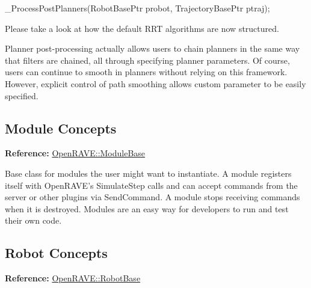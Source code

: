 \begin{DoxyCode}
_ProcessPostPlanners(RobotBasePtr probot, TrajectoryBasePtr ptraj);
\end{DoxyCode}


Please take a look at how the default RRT algorithms are now structured.

Planner post-\/processing actually allows users to chain planners in the same way that filters are chained, all through specifying planner parameters. Of course, users can continue to smooth in planners without relying on this framework. However, explicit control of path smoothing allows custom parameter to be easily specified. \hypertarget{arch_module}{}\subsection{Module Concepts}\label{arch_module}
{\bfseries Reference:} \hyperlink{classOpenRAVE_1_1ModuleBase}{OpenRAVE::ModuleBase}

Base class for modules the user might want to instantiate. A module registers itself with OpenRAVE's SimulateStep calls and can accept commands from the server or other plugins via SendCommand. A module stops receiving commands when it is destroyed. Modules are an easy way for developers to run and test their own code. \hypertarget{arch_robot}{}\subsection{Robot Concepts}\label{arch_robot}
{\bfseries Reference:} \hyperlink{classOpenRAVE_1_1RobotBase}{OpenRAVE::RobotBase}

